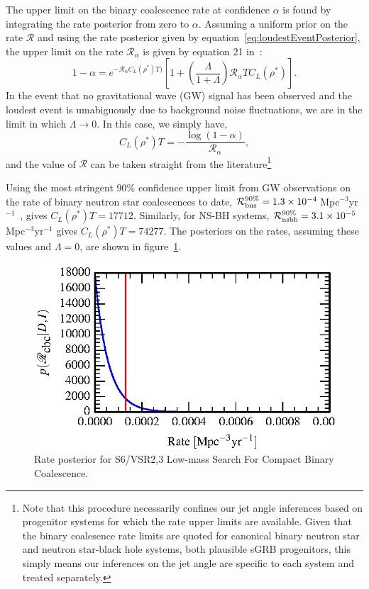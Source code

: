 \documentclass[twocolumn,nofootinbib]{revtex4-1}
\newcommand{\cbcrate}{{{\mathcal R}}}
\newcommand{\rhostar}{{\rho^*}}
\def\gw#1{gravitational wave#1 (GW#1)\gdef\gw{GW}}
\begin{document}
The upper limit on the binary coalescence rate at confidence $\alpha$ is found
by integrating the rate posterior from zero to $\alpha$.  Assuming a uniform
prior on the rate $\cbcrate$ and using the rate posterior given by
equation~\ref{eq:loudestEventPosterior}, the upper limit on the rate
$\cbcrate_{\alpha}$ is given by equation 21 in~\cite{BradyFairhurst08}:
%
\begin{equation}
1-\alpha =  e^{-\cbcrate_{\alpha} C_L(\rhostar)T)}
\left[ 
1+ \left(\frac{\Lambda}{1+\Lambda}\right) \cbcrate_{\alpha} T C_L(\rhostar)
\right ].
\label{eq:rateIntegral}
\end{equation}
%
In the event that no \gw{} signal has been observed and the loudest event is
umabiguously due to background noise fluctuations, we are in the limit in which
$\Lambda \rightarrow 0$.  In this case, we simply have,
\begin{equation}
C_L(\rhostar)T = -\frac{\log(1-\alpha)}{\cbcrate_{\alpha}},
\end{equation}
%
and the value of $\cbcrate$ can be taken straight from the literature\footnote{Note
that this procedure necessarily confines our jet angle inferences based on
progenitor systems for which the rate upper limits are available.  Given that
the binary coalesence rate limits are quoted for canonical binary neutron star
and neutron star-black hole systems, both plausible sGRB progenitors, this
simply means our inferences on the jet angle are specific to each system and
treated separately.}

Using the most stringent 90\% confidence upper limit from \gw{} observations on
the rate of binary neutron star coalescences to date, $\cbcrate^{90\%}_{{\rm
bns}} = 1.3\times 10^{-4}$\,Mpc$^{-3}$yr$^{-1}$~\cite{S6lowmass}, gives
$C_L(\rhostar)T=17712$.  Similarly, for NS-BH systems,  $\cbcrate^{90\%}_{{\rm
nsbh}} = 3.1\times 10^{-5}$\,Mpc$^{-3}$yr$^{-1}$ gives $C_L(\rhostar)T=74277$.
The posteriors on the rates, assuming these values and $\Lambda=0$, are shown in
figure~\ref{fig:reconstructedRatePosterior}.  

\begin{figure}
\includegraphics{iLIGO/rate_posterior_s6UL_TEST_deltaEffPrior-1.0.eps}
\caption{Rate posterior for S6/VSR2,3 Low-mass Search For Compact Binary
Coalescence.\label{fig:reconstructedRatePosterior}}
\end{figure}
\end{document}

